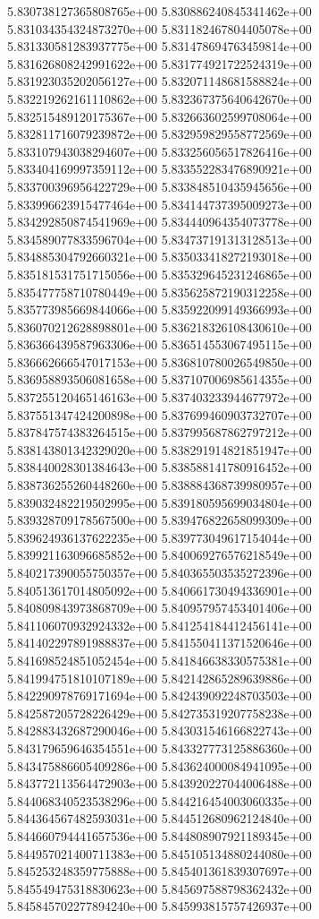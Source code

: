 5.830738127365808765e+00
5.830886240845341462e+00
5.831034354324873270e+00
5.831182467804405078e+00
5.831330581283937775e+00
5.831478694763459814e+00
5.831626808242991622e+00
5.831774921722524319e+00
5.831923035202056127e+00
5.832071148681588824e+00
5.832219262161110862e+00
5.832367375640642670e+00
5.832515489120175367e+00
5.832663602599708064e+00
5.832811716079239872e+00
5.832959829558772569e+00
5.833107943038294607e+00
5.833256056517826416e+00
5.833404169997359112e+00
5.833552283476890921e+00
5.833700396956422729e+00
5.833848510435945656e+00
5.833996623915477464e+00
5.834144737395009273e+00
5.834292850874541969e+00
5.834440964354073778e+00
5.834589077833596704e+00
5.834737191313128513e+00
5.834885304792660321e+00
5.835033418272193018e+00
5.835181531751715056e+00
5.835329645231246865e+00
5.835477758710780449e+00
5.835625872190312258e+00
5.835773985669844066e+00
5.835922099149366993e+00
5.836070212628898801e+00
5.836218326108430610e+00
5.836366439587963306e+00
5.836514553067495115e+00
5.836662666547017153e+00
5.836810780026549850e+00
5.836958893506081658e+00
5.837107006985614355e+00
5.837255120465146163e+00
5.837403233944677972e+00
5.837551347424200898e+00
5.837699460903732707e+00
5.837847574383264515e+00
5.837995687862797212e+00
5.838143801342329020e+00
5.838291914821851947e+00
5.838440028301384643e+00
5.838588141780916452e+00
5.838736255260448260e+00
5.838884368739980957e+00
5.839032482219502995e+00
5.839180595699034804e+00
5.839328709178567500e+00
5.839476822658099309e+00
5.839624936137622235e+00
5.839773049617154044e+00
5.839921163096685852e+00
5.840069276576218549e+00
5.840217390055750357e+00
5.840365503535272396e+00
5.840513617014805092e+00
5.840661730494336901e+00
5.840809843973868709e+00
5.840957957453401406e+00
5.841106070932924332e+00
5.841254184412456141e+00
5.841402297891988837e+00
5.841550411371520646e+00
5.841698524851052454e+00
5.841846638330575381e+00
5.841994751810107189e+00
5.842142865289639886e+00
5.842290978769171694e+00
5.842439092248703503e+00
5.842587205728226429e+00
5.842735319207758238e+00
5.842883432687290046e+00
5.843031546166822743e+00
5.843179659646354551e+00
5.843327773125886360e+00
5.843475886605409286e+00
5.843624000084941095e+00
5.843772113564472903e+00
5.843920227044006488e+00
5.844068340523538296e+00
5.844216454003060335e+00
5.844364567482593031e+00
5.844512680962124840e+00
5.844660794441657536e+00
5.844808907921189345e+00
5.844957021400711383e+00
5.845105134880244080e+00
5.845253248359775888e+00
5.845401361839307697e+00
5.845549475318830623e+00
5.845697588798362432e+00
5.845845702277894240e+00
5.845993815757426937e+00
